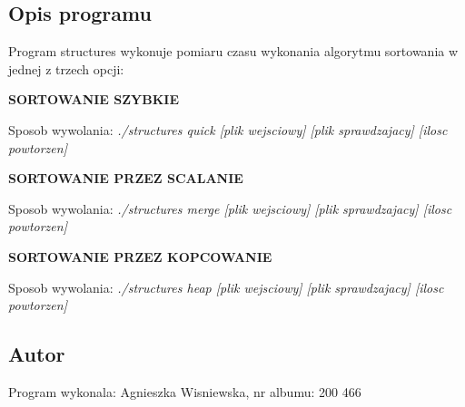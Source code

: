 \hypertarget{index_opis}{}\subsection{Opis programu}\label{index_opis}
Program structures wykonuje pomiaru czasu wykonania algorytmu sortowania w jednej z trzech opcji\-: \par
\par
 {\bfseries S\-O\-R\-T\-O\-W\-A\-N\-I\-E S\-Z\-Y\-B\-K\-I\-E}\par
 Sposob wywolania\-: {\itshape {\ttfamily ./structures quick \mbox{[}plik wejsciowy\mbox{]} \mbox{[}plik sprawdzajacy\mbox{]} \mbox{[}ilosc powtorzen\mbox{]}}}\par


{\bfseries S\-O\-R\-T\-O\-W\-A\-N\-I\-E P\-R\-Z\-E\-Z S\-C\-A\-L\-A\-N\-I\-E}\par
 Sposob wywolania\-: {\itshape {\ttfamily ./structures merge \mbox{[}plik wejsciowy\mbox{]} \mbox{[}plik sprawdzajacy\mbox{]} \mbox{[}ilosc powtorzen\mbox{]}}}\par


{\bfseries S\-O\-R\-T\-O\-W\-A\-N\-I\-E P\-R\-Z\-E\-Z K\-O\-P\-C\-O\-W\-A\-N\-I\-E}\par
 Sposob wywolania\-: {\itshape {\ttfamily ./structures heap \mbox{[}plik wejsciowy\mbox{]} \mbox{[}plik sprawdzajacy\mbox{]} \mbox{[}ilosc powtorzen\mbox{]}}}\par
\hypertarget{index_autor}{}\subsection{Autor}\label{index_autor}
Program wykonala\-: Agnieszka Wisniewska, nr albumu\-: 200 466 